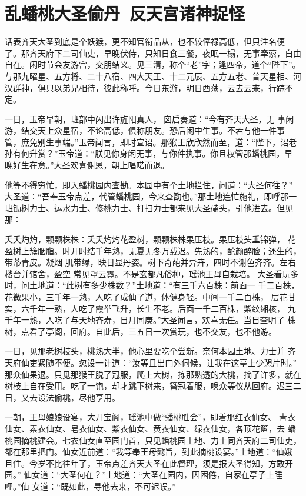 \chapter{乱蟠桃大圣偷丹~反天宫诸神捉怪}

话表齐天大圣到底是个妖猴，更不知官衔品从，也不较俸禄高低，但只注名便
了。那齐天府下二司仙吏，早晚伏侍，只知日食三餐，夜眠一榻，无事牵萦，自由
自在。闲时节会友游宫，交朋结义。见三清，称个“老”字；逢四帝，道个“陛下”。
与那九曜星、五方将、二十八宿、四大天王、十二元辰、五方五老、普天星相、河
汉群神，俱只以弟兄相待，彼此称呼。今日东游，明日西荡，云去云来，行踪不定。

一日，玉帝早朝，班部中闪出许旌阳真人，囟启奏道：“今有齐天大圣，无
事闲游，结交天上众星宿，不论高低，俱称朋友。恐后闲中生事。不若与他一件事
管，庶免别生事端。”玉帝闻言，即时宣诏。那猴王欣欣然而至，道：“陛下，诏老
孙有何升赏？”玉帝道：“朕见你身闲无事，与你件执事。你且权管那蟠桃园，早
晚好生在意。”大圣欢喜谢恩，朝上唱喏而退。

他等不得穷忙，即入蟠桃园内查勘。本园中有个土地拦住，问道：“大圣何往？”
大圣道：“吾奉玉帝点差，代管蟠桃园，今来查勘也。”那土地连忙施礼，即呼那一
班锄树力士、运水力士、修桃力士、打扫力士都来见大圣磕头，引他进去。但见那：

夭夭灼灼，颗颗株株：夭夭灼灼花盈树，颗颗株株果压枝。果压枝头垂锦弹，
花盈树上簇胭脂。时开时结千年熟，无夏无冬万载迟。先熟的，酡颜醉脸；还生的，
带蒂青皮。凝烟
肌带绿，映日显丹姿。树下奇葩并异卉，四时不谢色齐齐。左右楼台并馆舍，盈空
常见罩云霓。不是玄都凡俗种，瑶池王母自栽培。
大圣看玩多时，问土地道：“此树有多少株数？”土地道：“有三千六百株：前面一
千二百株，花微果小，三千年一熟，人吃了成仙了道，体健身轻。中间一千二百株，
层花甘实，六千年一熟，人吃了霞举飞升，长生不老。后面一千二百株，紫纹缃核，
九千年一熟，人吃了与天地齐寿，日月同庚。”大圣闻言，欢喜无任。当日查明了
株树，点看了亭阁，回府。自此后，三五日一次赏玩，也不交友，也不他游。

一日，见那老树枝头，桃熟大半，他心里要吃个尝新。奈何本园土地、力士并
齐天府仙吏紧随不便。忽设一计道：“汝等且出门外伺候，让我在这亭上少憩片时。”
那众仙果退。只见那猴王脱了冠服，爬上大树，拣那熟透的大桃，摘了许多，就在
树枝上自在受用。吃了一饱，却才跳下树来，簪冠着服，唤众等仪从回府。迟三二
日，又去设法偷桃，尽他享用。

一朝，王母娘娘设宴，大开宝阁，瑶池中做“蟠桃胜会”，即着那红衣仙女、
青衣仙女、素衣仙女、皂衣仙女、紫衣仙女、黄衣仙女、绿衣仙女，各顶花篮，去
蟠桃园摘桃建会。七衣仙女直至园门首，只见蟠桃园土地、力士同齐天府二司仙吏，
都在那里把门。仙女近前道：“我等奉王母懿旨，到此摘桃设宴。”土地道：“仙娥
且住。今岁不比往年了，玉帝点差齐天大圣在此督理，须是报大圣得知，方敢开园。”
仙女道：“大圣何在？”土地道：“大圣在园内，因困倦，自家在亭子上睡哩。”仙
女道：“既如此，寻他去来，不可迟误。”

